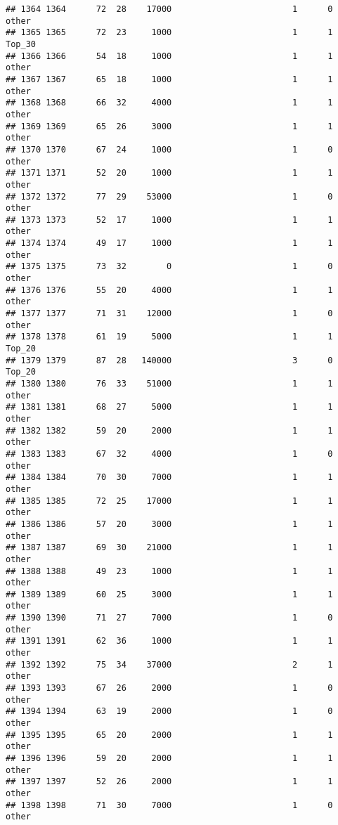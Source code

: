 \documentclass[
]{article}
\begin{document}
\begin{verbatim}
## 1364 1364      72  28    17000                        1      0    other
## 1365 1365      72  23     1000                        1      1   Top_30
## 1366 1366      54  18     1000                        1      1    other
## 1367 1367      65  18     1000                        1      1    other
## 1368 1368      66  32     4000                        1      1    other
## 1369 1369      65  26     3000                        1      1    other
## 1370 1370      67  24     1000                        1      0    other
## 1371 1371      52  20     1000                        1      1    other
## 1372 1372      77  29    53000                        1      0    other
## 1373 1373      52  17     1000                        1      1    other
## 1374 1374      49  17     1000                        1      1    other
## 1375 1375      73  32        0                        1      0    other
## 1376 1376      55  20     4000                        1      1    other
## 1377 1377      71  31    12000                        1      0    other
## 1378 1378      61  19     5000                        1      1   Top_20
## 1379 1379      87  28   140000                        3      0   Top_20
## 1380 1380      76  33    51000                        1      1    other
## 1381 1381      68  27     5000                        1      1    other
## 1382 1382      59  20     2000                        1      1    other
## 1383 1383      67  32     4000                        1      0    other
## 1384 1384      70  30     7000                        1      1    other
## 1385 1385      72  25    17000                        1      1    other
## 1386 1386      57  20     3000                        1      1    other
## 1387 1387      69  30    21000                        1      1    other
## 1388 1388      49  23     1000                        1      1    other
## 1389 1389      60  25     3000                        1      1    other
## 1390 1390      71  27     7000                        1      0    other
## 1391 1391      62  36     1000                        1      1    other
## 1392 1392      75  34    37000                        2      1    other
## 1393 1393      67  26     2000                        1      0    other
## 1394 1394      63  19     2000                        1      0    other
## 1395 1395      65  20     2000                        1      1    other
## 1396 1396      59  20     2000                        1      1    other
## 1397 1397      52  26     2000                        1      1    other
## 1398 1398      71  30     7000                        1      0    other

\end{verbatim}
\end{document}
